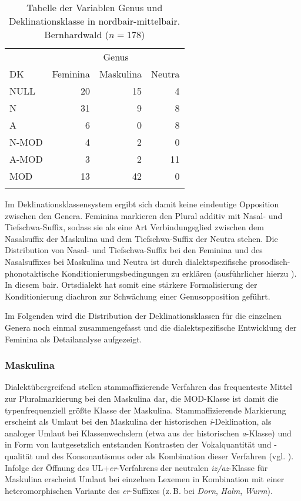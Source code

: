 \begin{table}
    \begin{tabular}{lrrr}
    \lsptoprule
         & \multicolumn{3}{c}{Genus} \\
         \cmidrule(lr){2-4}
        DK & Feminina & Maskulina & Neutra\\
        \midrule
        NULL & 20 & 15 & 4\\
        N & 31 & 9 & 8 \\
        A & 6 & 0 & 8 \\
        N-MOD & 4 & 2 & 0\\
        A-MOD & 3 & 2 & 11\\
        MOD & 13 & 42 & 0\\
        \lspbottomrule
    \end{tabular}
    \caption{Tabelle der Variablen Genus und Deklinationsklasse in nordbair-mittelbair. Bernhardwald ($n = 178$)}
    \label{tabfig:14b}
\end{table}

Im Deklinationsklassensystem ergibt sich damit keine eindeutige Opposition zwischen den Genera. Feminina markieren den Plural additiv mit Nasal- und Tiefschwa-Suffix, sodass sie als eine Art Verbindungsglied zwischen dem Nasalsuffix der Maskulina und dem Tiefschwa-Suffix der Neutra stehen. Die Distribution von Nasal- und Tiefschwa-Suffix bei den Feminina und des Nasalsuffixes bei Maskulina und Neutra ist durch dialektspezifische prosodisch-phonotaktische Konditionierungsbedingungen zu erklären (ausführlicher hierzu ). In diesem bair. Ortsdialekt hat somit eine stärkere Formalisierung der Konditionierung diachron zur Schwächung einer Genusopposition geführt.

Im Folgenden wird die Distribution der Deklinationsklassen für die einzelnen Genera noch einmal zusammengefasst und die dialektspezifische Entwicklung der Feminina als Detailanalyse aufgezeigt.

\subsubsection{Maskulina}
\label{sec:8.3.1.1}
Dialektübergreifend stellen stammaffizierende Verfahren das frequenteste Mittel zur Pluralmarkierung bei den Maskulina dar, die MOD-Klasse ist damit die typenfrequenziell größte Klasse der Maskulina. Stammaffizierende Markierung erscheint als Umlaut bei den Maskulina der historischen \textit{i}{}-Deklination, als analoger Umlaut bei Klassenwechslern (etwa aus der historischen \textit{a}{}-Klasse) und in Form von lautgesetzlich entstanden Kontrasten der Vokalquantität und -qualität und des Konsonantismus oder als Kombination dieser Verfahren (vgl. ). Infolge der Öffnung des UL+\textit{er}{}-Verfahrens der neutralen \textit{iz/az}{}-Klasse für Maskulina erscheint Umlaut bei einzelnen Lexemen in Kombination mit einer heteromorphischen Variante des \textit{er}{}-Suffixes (z.\,B. bei \textit{Dorn}, \textit{Halm}, \textit{Wurm}).

